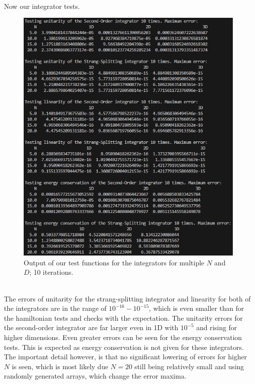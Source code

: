\documentclass[11pt, letterpaper, onecolumn]{article}
\begin{document}
	\\
	Now our integrator tests. 
	\begin{figure} [h] 
	\begin{center}
	\includegraphics[width=13cm]{"test_integrators2.png"}
	\caption{Output of our test functions for the integrators for multiple $N$ and $D$; 10 iterations.}
	\end{center}
	\end{figure}
	\\
	The errors of unitarity for the strang-splitting integrator and linearity for both of the integrators are in the range of $10^{-16}-10^{-15}$, which is even smaller than for the hamiltonian tests and checks with the expectation. The unitarity errors for the second-order integrator are far larger even in 1D with $10^{-5}$ and rising for higher dimensions. Even greater errors can be seen for the energy conservation tests. This is expected as energy conservation is not given for these integrators. The important detail however, is that no significant lowering of errors for higher $N$ is seen, which is most likely due $N=20$ still being relatively small and using randomly generated arrays, which change the error maxima.
	\\
\end{document}
